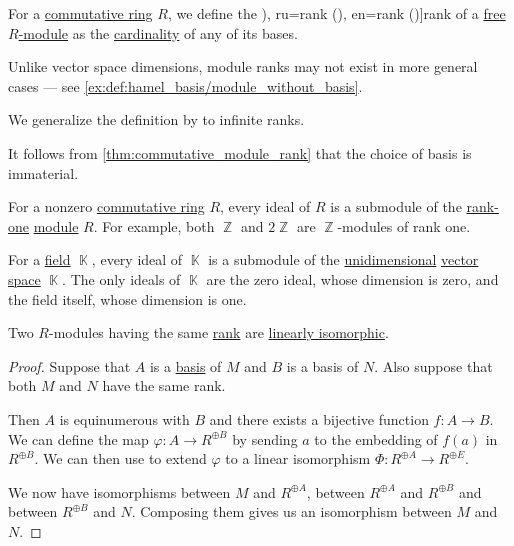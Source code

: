 \begin{definition}\label{def:module_rank}\mimprovised
  For a \hyperref[def:ring/commutative]{commutative ring} \( R \), we define the \term[bg=rank (\cite[32]{КоцевСидеров2016КомутативнаАлгебра}), ru=rank (\cite[47]{Шафаревич2019ОсновныеПонятияАлгебры}), en=rank (\cite[171]{Jacobson1985BasicAlgebraI})]{rank} of a \hyperref[def:free_semimodule]{free \( R \)-module} as the \hyperref[def:cardinality]{cardinality} of any of its bases.
\end{definition}
\begin{comments}
  \item Unlike vector space dimensions, module ranks may not exist in more general cases --- see \cref{ex:def:hamel_basis/module_without_basis}.
  \item We generalize the definition by \textcite[171]{Jacobson1985BasicAlgebraI} to infinite ranks.
\end{comments}
\begin{defproof}
  It follows from \cref{thm:commutative_module_rank} that the choice of basis is immaterial.
\end{defproof}

\begin{example}\label{ex:field_submodules}
  For a nonzero \hyperref[def:ring/commutative]{commutative ring} \( R \), every ideal of \( R \) is a submodule of the \hyperref[def:module_rank]{rank-one} \hyperref[def:module]{module} \( R \). For example, both \( \BbbZ \) and \( 2\BbbZ \) are \( \BbbZ \)-modules of rank one.

  For a \hyperref[def:field]{field} \( \BbbK \), every ideal of \( \BbbK \) is a submodule of the \hyperref[thm:vector_space_dimension]{unidimensional} \hyperref[def:vector_space]{vector space} \( \BbbK \). The only ideals of \( \BbbK \) are the zero ideal, whose dimension is zero, and the field itself, whose dimension is one.
\end{example}

\begin{proposition}\label{thm:modules_with_same_rank_are_isomorphic}
  Two \( R \)-modules having the same \hyperref[def:module_rank]{rank} are \hyperref[def:linear_function]{linearly isomorphic}.
\end{proposition}
\begin{proof}
  Suppose that \( A \) is a \hyperref[def:hamel_basis]{basis} of \( M \) and \( B \) is a basis of \( N \). Also suppose that both \( M \) and \( N \) have the same rank.

  Then \( A \) is equinumerous with \( B \) and there exists a bijective function \( f: A \to B \). We can define the map \( \varphi: A \to R^{\oplus B} \) by sending \( a \) to the embedding of \( f(a) \) in \( R^{\oplus B} \). We can then use  to extend \( \varphi \) to a linear isomorphism \( \Phi: R^{\oplus A} \to R^{\oplus E} \).

  We now have isomorphisms between \( M \) and \( R^{\oplus A} \), between \( R^{\oplus A} \) and \( R^{\oplus B} \) and between \( R^{\oplus B} \) and \( N \). Composing them gives us an isomorphism between \( M \) and \( N \).
\end{proof}

